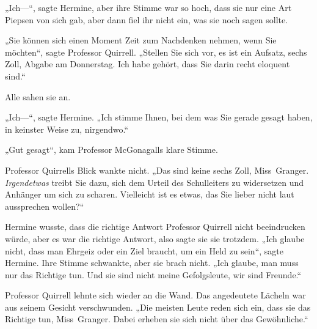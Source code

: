 „Ich—“, sagte Hermine, aber ihre Stimme war so hoch, dass sie nur eine Art Piepsen von sich gab, aber dann fiel ihr nicht ein, was sie noch sagen sollte.

„Sie können sich einen Moment Zeit zum Nachdenken nehmen, wenn Sie möchten“, sagte Professor Quirrell. „Stellen Sie sich vor, es ist ein Aufsatz, sechs Zoll, Abgabe am Donnerstag. Ich habe gehört, dass Sie darin recht eloquent sind.“

Alle sahen sie an.

„Ich—“, sagte Hermine. „Ich stimme Ihnen, bei dem was Sie gerade gesagt haben, in keinster Weise zu, nirgendwo.“

„Gut gesagt“, kam Professor McGonagalls klare Stimme.

Professor Quirrells Blick wankte nicht. „Das sind keine sechs Zoll, Miss~Granger. \emph{Irgendetwas} treibt Sie dazu, sich dem Urteil des Schulleiters zu widersetzen und Anhänger um sich zu scharen. Vielleicht ist es etwas, das Sie lieber nicht laut aussprechen wollen?“

Hermine wusste, dass die richtige Antwort Professor Quirrell nicht beeindrucken würde, aber es war die richtige Antwort, also sagte sie sie trotzdem. „Ich glaube nicht, dass man Ehrgeiz oder ein Ziel braucht, um ein Held zu sein“, sagte Hermine. Ihre Stimme schwankte, aber sie brach nicht. „Ich glaube, man muss nur das Richtige tun. Und sie sind nicht meine Gefolgsleute, wir sind Freunde.“

Professor Quirrell lehnte sich wieder an die Wand. Das angedeutete Lächeln war aus seinem Gesicht verschwunden. „Die meisten Leute reden sich ein, dass sie das Richtige tun, Miss~Granger. Dabei erheben sie sich nicht über das Gewöhnliche.“

